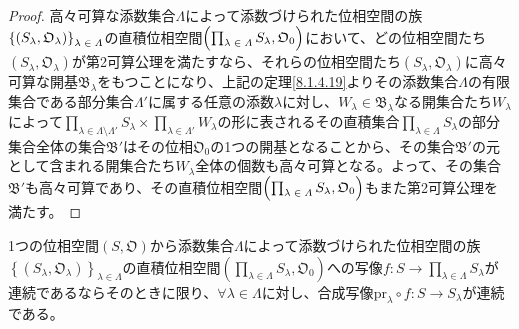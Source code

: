 \documentclass[dvipdfmx]{jsarticle}
\begin{document}
\begin{proof}
高々可算な添数集合$\varLambda$によって添数づけられた位相空間の族$\left\{ \left( S_{\lambda},\mathfrak{O}_{\lambda} \right) \right\}_{\scriptsize \begin{matrix}
\lambda \in \varLambda \\
\end{matrix}}$の直積位相空間$\left( \prod_{\scriptsize \begin{matrix}
\lambda \in \varLambda \\
\end{matrix}} S_{\lambda},\mathfrak{O}_{0} \right)$において、どの位相空間たち$\left( S_{\lambda},\mathfrak{O}_{\lambda} \right)$が第2可算公理を満たすなら、それらの位相空間たち$\left( S_{\lambda},\mathfrak{O}_{\lambda} \right)$に高々可算な開基$\mathfrak{B}_{\lambda}$をもつことになり、上記の定理\ref{8.1.4.19}よりその添数集合$\varLambda$の有限集合である部分集合$\varLambda'$に属する任意の添数$\lambda$に対し、$W_{\lambda} \in \mathfrak{B}_{\lambda}$なる開集合たち$W_{\lambda}$によって$\prod_{\lambda \in \varLambda \setminus \varLambda'} S_{\lambda} \times \prod_{\lambda \in \varLambda'} W_{\lambda}$の形に表されるその直積集合$\prod_{\lambda \in \varLambda} S_{\lambda}$の部分集合全体の集合$\mathfrak{B}'$はその位相$\mathfrak{O}_{0}$の1つの開基となることから、その集合$\mathfrak{B}'$の元として含まれる開集合たち$W_{\lambda}$全体の個数も高々可算となる。よって、その集合$\mathfrak{B}'$も高々可算であり、その直積位相空間$\left( \prod_{\scriptsize \begin{matrix}
\lambda \in \varLambda \\
\end{matrix}} S_{\lambda},\mathfrak{O}_{0} \right)$もまた第2可算公理を満たす。
\end{proof}
\begin{thm}\label{8.1.4.23}
1つの位相空間$\left( S,\mathfrak{O} \right)$から添数集合$\varLambda$によって添数づけられた位相空間の族$\left\{ \left( S_{\lambda},\mathfrak{O}_{\lambda} \right) \right\}_{\lambda \in \varLambda}$の直積位相空間$\left( \prod_{\lambda \in \varLambda} S_{\lambda},\mathfrak{O}_{0} \right)$への写像$f:S \rightarrow \prod_{\lambda \in \varLambda} S_{\lambda}$が連続であるならそのときに限り、$\forall\lambda \in \varLambda$に対し、合成写像${\mathrm{pr}}_{\lambda} \circ f:S \rightarrow S_{\lambda}$が連続である。
\end{thm}
\end{document}
